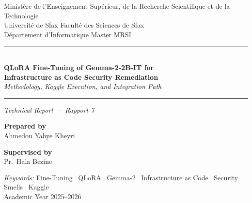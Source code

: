 \documentclass[12pt, a4paper]{report}
\begin{document}

\begin{titlepage}
  \centering

  \vspace*{2.5cm}
  {\small Ministère de l'Enseignement Supérieur, de la Recherche Scientifique
   et de la Technologie}\\[4pt]
  {\small Université de Sfax \enspace\textbar\enspace Faculté des Sciences de Sfax}\\[4pt]
  {\small Département d'Informatique \enspace\textbar\enspace Master MRSI}

  \vspace{2.5cm}

  \noindent\rule{\linewidth}{0.6pt}\\[0.8cm]

  {\Large\bfseries\color{titleblue}
    QLoRA Fine-Tuning of Gemma-2-2B-IT for\\[6pt]
    Infrastructure as Code Security Remediation
  }\\[0.4cm]

  {\normalsize\itshape Methodology, Kaggle Execution, and Integration Path}\\[0.6cm]

  \noindent\rule{\linewidth}{0.6pt}

  \vspace{0.6cm}
  {\normalsize\itshape Technical Report --- Rapport 7}

  \vspace{3cm}
  \begin{minipage}[t]{0.45\textwidth}
    \raggedright
    {\small\bfseries Prepared by}\\[4pt]
    {\normalsize Ahmedou Yahye Kheyri}\\[2pt]
  \end{minipage}
  \hfill
  \begin{minipage}[t]{0.45\textwidth}
    \raggedleft
    {\small\bfseries Supervised by}\\[4pt]
    {\normalsize Pr.\ Hala Bezine}\\[2pt]
  \end{minipage}

  \vfill
  {\small\textit{Keywords:}\enspace
   Fine-Tuning \textbullet\
   QLoRA \textbullet\
   Gemma-2 \textbullet\
   Infrastructure as Code \textbullet\
   Security Smells \textbullet\
   Kaggle}\\[1.2cm]

  {\small Academic Year 2025--2026}
  \vspace{1cm}

\end{titlepage}
\end{document}
